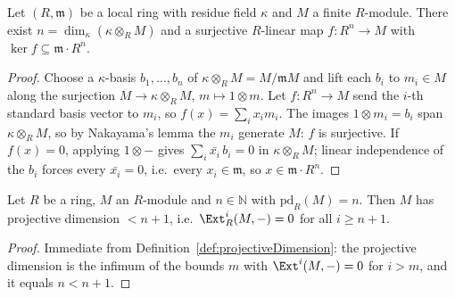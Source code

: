 \begin{lemma}
  \label{lem:minimal_surjection}
  \leanok
  Let \((R, \mathfrak m)\) be a local ring with residue field \(\kappa\) and \(M\) a
  finite \(R\)-module. There exist \(n = \dim_\kappa(\kappa \otimes_R M)\) and a
  surjective \(R\)-linear map \(f : R^n \to M\) with
  \(\ker f \subseteq \mathfrak m \cdot R^n\).
\end{lemma}
\begin{proof}
  \leanok
  Choose a \(\kappa\)-basis \(b_1, \dots, b_n\) of \(\kappa \otimes_R M = M/\mathfrak m M\)
  and lift each \(b_i\) to \(m_i \in M\) along the surjection
  \(M \to \kappa \otimes_R M\), \(m \mapsto 1 \otimes m\). Let \(f : R^n \to M\) send
  the \(i\)-th standard basis vector to \(m_i\), so
  \(f(x) = \sum_i x_i m_i\). The images \(1 \otimes m_i = b_i\) span
  \(\kappa \otimes_R M\), so by Nakayama's lemma the \(m_i\) generate \(M\): \(f\) is
  surjective. If \(f(x) = 0\), applying \(1 \otimes -\) gives
  \(\sum_i \bar{x_i}\, b_i = 0\) in \(\kappa \otimes_R M\); linear independence of the
  \(b_i\) forces every \(\bar{x_i} = 0\), i.e.\ every \(x_i \in \mathfrak m\), so
  \(x \in \mathfrak m \cdot R^n\).
\end{proof}

\begin{lemma}
  \label{lem:pd_lt_of_pd_eq}
  \leanok
  Let \(R\) be a ring, \(M\) an \(R\)-module and \(n \in \mathbb{N}\) with
  \(\mathrm{pd}_R(M) = n\). Then \(M\) has projective dimension \(< n + 1\), i.e.\
  \(\Ext^i_R(M, -) = 0\) for all \(i \geq n + 1\).
\end{lemma}
\begin{proof}
  \leanok
  Immediate from Definition~\ref{def:projectiveDimension}: the projective dimension is
  the infimum of the bounds \(m\) with \(\Ext^i(M,-) = 0\) for \(i > m\), and it equals
  \(n < n+1\).
\end{proof}

